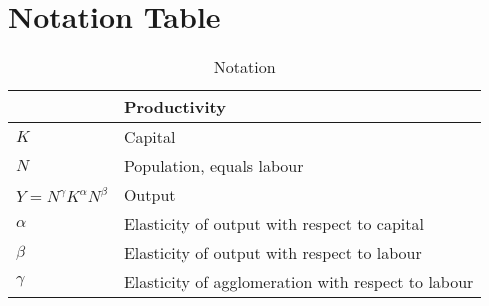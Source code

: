 \section{Notation Table}
\begin{longtable}{lp{10cm}}
\caption{Notation}                       \\

\hline           &  \textbf{Productivity} \\ \hline
$K$              &  Capital               \\ 
$N$              &  Population, equals labour \\ %
$Y=N^\gamma K^{\alpha }N^{\beta }$  &  Output \\ %
$\alpha$         &  Elasticity of output with respect to capital          \\
$\beta$          &  Elasticity of output with respect to labour           \\ %
$\gamma$         &  Elasticity of agglomeration with respect to labour    \\ %



\end{longtable}
